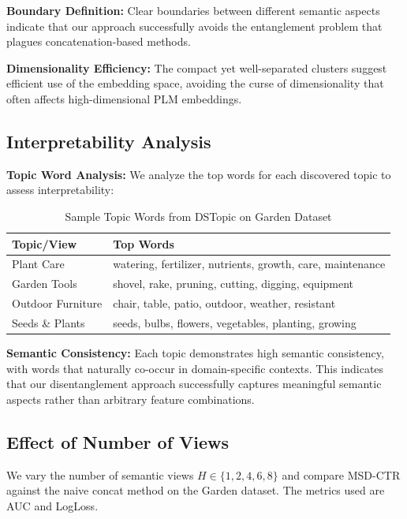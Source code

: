 \textbf{Boundary Definition:} Clear boundaries between different semantic aspects indicate that our approach successfully avoids the entanglement problem that plagues concatenation-based methods.

\textbf{Dimensionality Efficiency:} The compact yet well-separated clusters suggest efficient use of the embedding space, avoiding the curse of dimensionality that often affects high-dimensional PLM embeddings.

\subsection{Interpretability Analysis}

\textbf{Topic Word Analysis:} We analyze the top words for each discovered topic to assess interpretability:

\begin{table}[htbp]
\centering
\caption{Sample Topic Words from DSTopic on Garden Dataset}
\label{tab:topic-words}
\begin{tabular}{l|l}
\toprule
\textbf{Topic/View} & \textbf{Top Words} \\
\midrule
Plant Care & watering, fertilizer, nutrients, growth, care, maintenance \\
Garden Tools & shovel, rake, pruning, cutting, digging, equipment \\
Outdoor Furniture & chair, table, patio, outdoor, weather, resistant \\
Seeds \& Plants & seeds, bulbs, flowers, vegetables, planting, growing \\
\bottomrule
\end{tabular}
\end{table}

\textbf{Semantic Consistency:} Each topic demonstrates high semantic consistency, with words that naturally co-occur in domain-specific contexts. This indicates that our disentanglement approach successfully captures meaningful semantic aspects rather than arbitrary feature combinations.

\subsection{Effect of Number of Views}

We vary the number of semantic views $H \in \{1, 2, 4, 6, 8\}$ and compare MSD-CTR against the naive concat method on the Garden dataset. The metrics used are AUC and LogLoss.

